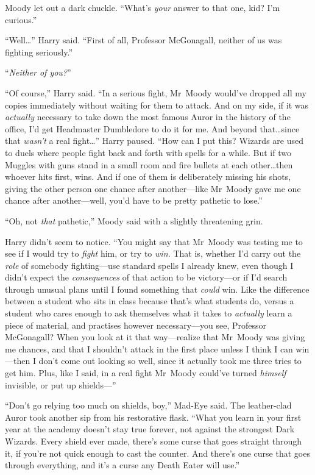 Moody let out a dark chuckle. “What’s \emph{your} answer to that one, kid? I’m curious.”

“Well…” Harry said. “First of all, Professor McGonagall, neither of us was fighting seriously.”

“\emph{Neither of you?}”

“Of course,” Harry said. “In a serious fight, Mr~Moody would’ve dropped all my copies immediately without waiting for them to attack. And on my side, if it was \emph{actually} necessary to take down the most famous Auror in the history of the office, I’d get Headmaster Dumbledore to do it for me. And beyond that…since that \emph{wasn’t} a real fight…” Harry paused. “How can I put this? Wizards are used to duels where people fight back and forth with spells for a while. But if two Muggles with guns stand in a small room and fire bullets at each other…then whoever hits first, wins. And if one of them is deliberately missing his shots, giving the other person one chance after another—like Mr~Moody gave me one chance after another—well, you’d have to be pretty pathetic to lose.”

“Oh, not \emph{that} pathetic,” Moody said with a slightly threatening grin.

Harry didn’t seem to notice. “You might say that Mr~Moody was testing me to see if I would try to \emph{fight} him, or try to \emph{win.} That is, whether I’d carry out the \emph{role} of somebody fighting—use standard spells I already knew, even though I didn’t expect the \emph{consequences} of that action to be victory—or if I’d search through unusual plans until I found something that \emph{could} win. Like the difference between a student who sits in class because that’s what students do, versus a student who cares enough to ask themselves what it takes to \emph{actually} learn a piece of material, and practises however necessary—you see, Professor McGonagall? When you look at it that way—realize that Mr~Moody was giving me chances, and that I shouldn’t attack in the first place unless I think I can win—then I don’t come out looking so well, since it actually took me three tries to get him. Plus, like I said, in a real fight Mr~Moody could’ve turned \emph{himself} invisible, or put up shields—”

“Don’t go relying too much on shields, boy,” Mad-Eye said. The leather-clad Auror took another sip from his restorative flask. “What you learn in your first year at the academy doesn’t stay true forever, not against the strongest Dark Wizards. Every shield ever made, there’s some curse that goes straight through it, if you’re not quick enough to cast the counter. And there’s one curse that goes through everything, and it’s a curse any Death Eater will use.”

